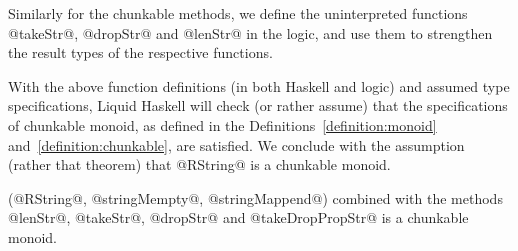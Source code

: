 Similarly for the chunkable methods, we define the uninterpreted functions
@takeStr@, @dropStr@ and @lenStr@ in the logic,
and use them to strengthen the result types of the respective functions.
%
 With the above function definitions (in both Haskell and logic) and
assumed type specifications, Liquid Haskell will check (or rather
assume) that the specifications of chunkable monoid, as defined in the
Definitions~\ref{definition:monoid} and~\ref{definition:chunkable},
are satisfied.
%
We conclude with the assumption (rather that theorem)
that @RString@ is a chunkable monoid.
\begin{assumption}\label{assumption:rstring}
(@RString@, @stringMempty@, @stringMappend@)
combined with the methods
@lenStr@, @takeStr@, @dropStr@ and @takeDropPropStr@
is a chunkable monoid.
\end{assumption}
